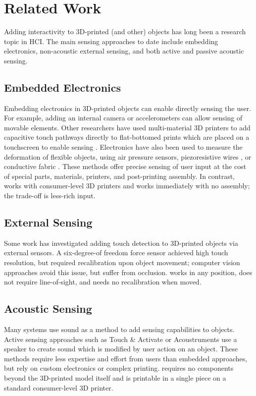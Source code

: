  \section{Related Work}
    Adding interactivity to 3D-printed (and other) objects has long been a
    research topic in HCI. The main sensing approaches to date include embedding
    electronics, non-acoustic external sensing, and both active and passive
    acoustic sensing.
    
    \subsection{Embedded Electronics}
        Embedding electronics in 3D-printed objects can enable directly sensing
        the user. For example, adding an internal camera \cite{Savage:2013kua}
        or accelerometers \cite{Hook:2014kp} can allow sensing of movable
        elements. Other researchers have used multi-material 3D printers to add
        capacitive touch pathways directly to flat-bottomed prints which are
        placed on a touchscreen to enable sensing
        \cite{Schmitz:2015vj,Taylor:2016cv,Gotzelmann:2016jc}. Electronics have
        also been used to measure the deformation of flexible objects, using air
        pressure sensors\cite{Slyper:2012gh}, piezoresistive wires
        \cite{Bacher:2016ji}, or conductive fabric \cite{Peng:2015hr}. These
        methods offer precise sensing of user input at the cost of special
        parts, materials, printers, and post-printing assembly. In contrast, \bh
        works with consumer-level 3D printers and works immediately with no
        assembly; the trade-off is less-rich input.
        
    \subsection{External Sensing}
        Some work has investigated adding touch detection to 3D-printed objects
        via external sensors. A six-degree-of freedom force sensor
        \cite{Hudin:2016fp} achieved high touch resolution, but required
        recalibration upon object movement; computer vision approaches
        \cite{Reichinger:2016ec,Shi:2016bn} avoid this issue, but suffer from
        occlusion. \bh works in any position, does not require line-of-sight,
        and needs no recalibration when moved.
        
    \subsection{Acoustic Sensing}
        Many systems use sound as a method to add sensing capabilities to
        objects. Active sensing approaches such as Touch \& Activate
        \cite{Ono:2013cja} or Acoustruments \cite{Laput:2015hn} use a speaker to
        create sound which is modified by user action on an object. These
        methods require less expertise and effort from users than embedded
        approaches, but rely on custom electronics or complex printing. \bh
        requires no components beyond the 3D-printed model itself and is
        printable in a single piece on a standard consumer-level 3D printer.
    
